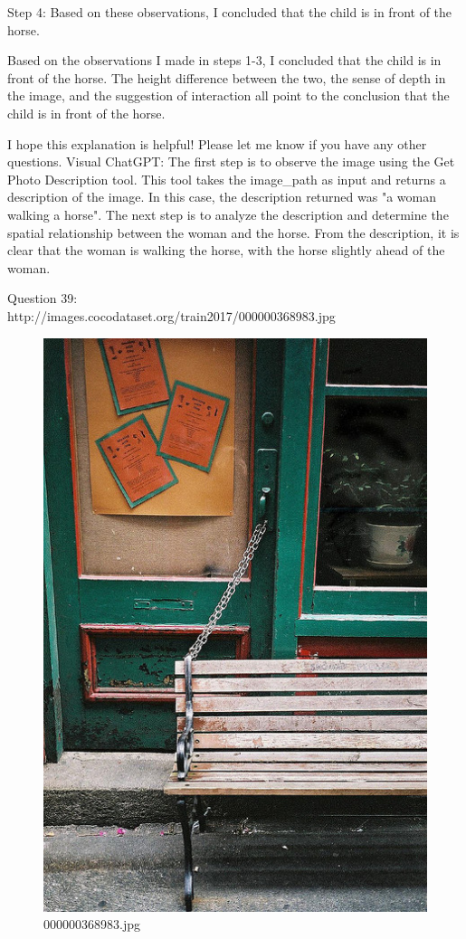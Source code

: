 \begin{enumerate}
        Step 4: Based on these observations, I concluded that the child is in front of the horse.
        
        Based on the observations I made in steps 1-3, I concluded that the child is in front of the horse. The height difference between the two, the sense of depth in the image, and the suggestion of interaction all point to the conclusion that the child is in front of the horse.
        
        I hope this explanation is helpful! Please let me know if you have any other questions.
        \subitem Visual ChatGPT: The first step is to observe the image using the Get Photo Description tool. This tool takes the image\_path as input and returns a description of the image. In this case, the description returned was "a woman walking a horse".
        The next step is to analyze the description and determine the spatial relationship between the woman and the horse. From the description, it is clear that the woman is walking the horse, with the horse slightly ahead of the woman.
    \end{enumerate}
    Question 39:\\http://images.cocodataset.org/train2017/000000368983.jpg
    \begin{figure}[h]
        \centering
        \includegraphics[width=0.8\linewidth]{../image set/easy/000000368983.jpg}
        \caption{000000368983.jpg}
    \end{figure}
